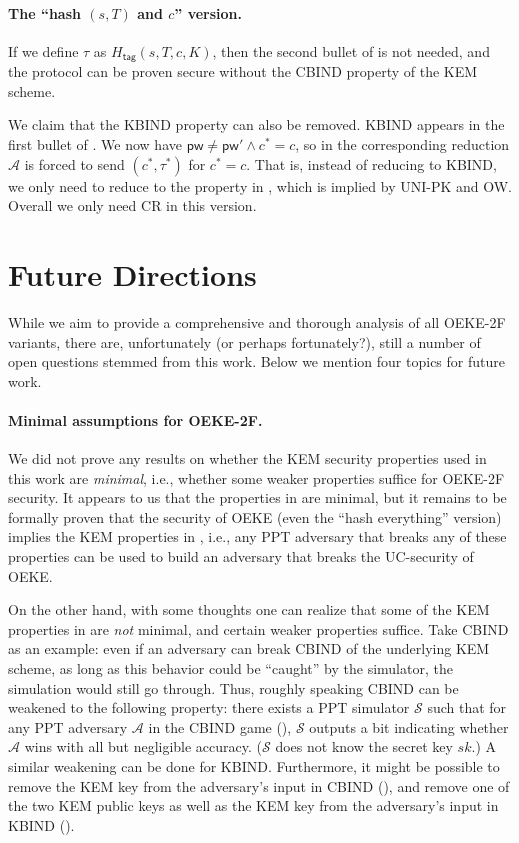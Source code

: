 \documentclass{article}
\theoremstyle{plain}
\theoremstyle{definition}
\theoremstyle{remark}
\newcommand{\adv}{\mathcal{A}}
\renewcommand{\sim}{\mathcal{S}}
\newcommand{\Htag}{H_\mathsf{tag}}
\newcommand{\pw}{\mathsf{pw}}
\begin{document}
\paragraph{The ``hash $(s,T)$ and $c$'' version.}
If we define $\tau$ as $\Htag(s,T,c,K)$, then the second bullet of  is not needed, and the protocol can be proven secure without the CBIND property of the KEM scheme.

We claim that the KBIND property can also be removed. KBIND appears in the first bullet of . We now have $\pw \neq \pw' \land c^* = c$, so in the corresponding reduction $\adv$ is forced to send $(c^*,\tau^*)$ for $c^* = c$. That is, instead of reducing to KBIND, we only need to reduce to the property in , which is implied by UNI-PK and OW. Overall we only need CR in this version.

\section{Future Directions}
\label{sec:future-work}
While we aim to provide a comprehensive and thorough analysis of all OEKE-2F variants, there are, unfortunately (or perhaps fortunately?), still a number of open questions stemmed from this work. Below we mention four topics for future work.

\paragraph{Minimal assumptions for OEKE-2F.}
We did not prove any results on whether the KEM security properties used in this work are \emph{minimal}, i.e., whether some weaker properties suffice for OEKE-2F security. It appears to us that the properties in  are minimal, but it remains to be formally proven that the security of OEKE (even the ``hash everything'' version) implies the KEM properties in , i.e., any PPT adversary that breaks any of these properties can be used to build an adversary that breaks the UC-security of OEKE.

On the other hand, with some thoughts one can realize that some of the KEM properties in  are \emph{not} minimal, and certain weaker properties suffice. Take CBIND as an example: even if an adversary can break CBIND of the underlying KEM scheme, as long as this behavior could be ``caught'' by the simulator, the simulation would still go through. Thus, roughly speaking CBIND can be weakened to the following property: there exists a PPT simulator $\sim$ such that for any PPT adversary $\adv$ in the CBIND game (), $\sim$ outputs a bit indicating whether $\adv$ wins with all but negligible accuracy. ($\sim$ does not know the secret key $sk$.) A similar weakening can be done for KBIND. Furthermore, it might be possible to remove the KEM key from the adversary's input in CBIND (), and remove one of the two KEM public keys as well as the KEM key from the adversary's input in KBIND ().
\end{document}
